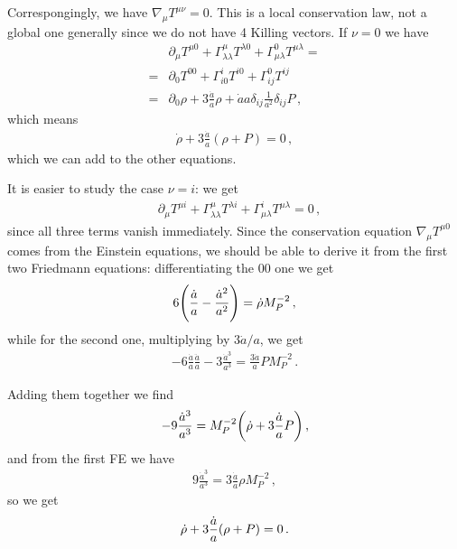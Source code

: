 \documentclass[main.tex]{subfiles}
\begin{document}
Correspongingly, we have \(\nabla_{\mu } T^{\mu \nu } =0 \). 
This is a local conservation law, not a global one generally since we do not have 4 Killing vectors. 
If \(\nu =0\) we have 
%
\begin{subequations}
\begin{align}
  &\partial_{\mu } T^{\mu 0} + \Gamma^{\mu }_{\lambda \lambda  } T^{\lambda 0} + \Gamma^{0}_{\mu \lambda } T^{\mu \lambda } = \\
  =& \partial_{0} T^{00} +
  \Gamma^{i}_{i0} T^{i0} + \Gamma^{0}_{ij} T^{ij} \\
  =& \partial_{0} \rho 
+ 3 \frac{\dot{a}}{a} \rho + \dot{a} a \delta_{ij} \frac{1}{a^2} \delta_{ij} P 
\,,
\end{align}
\end{subequations}
%
which means 
%
\begin{align}
  \dot{\rho} + 3 \frac{\dot{a}}{a} ( \rho +P) = 0
\,,
\end{align}
%
which we can add to the other equations. 

It is easier to study the case \(\nu = i\): we get 
%
\begin{align}
    &\partial_{\mu } T^{\mu i} + \Gamma^{\mu }_{\lambda \lambda  } T^{\lambda i} + \Gamma^{i}_{\mu \lambda } T^{\mu \lambda } = 0
\,,
\end{align}
%
since all three terms vanish immediately. Since the conservation  equation \(\nabla_{\mu } T^{\mu 0}\) comes from the Einstein equations, we should be able to derive it from the first two Friedmann equations: differentiating the 00 one we get 
%
\begin{align}
  6 \qty(\frac{\dot{a}}{a} - \frac{\dot{a}^2}{a^2}) = \dot{\rho} M_P^{-2} 
\,,
\end{align}
%
while for the second one, multiplying by \(3 \dot{a} / a\), we get 
%
\begin{align}
  - 6 \frac{\dot{a}}{a} \frac{\ddot{a}}{a}
  - 3 \frac{\dot{a}^3}{a^3} = \frac{3 \dot{a}}{a } P M_P^{-2}
\,.
\end{align}

Adding them together we find 
%
\begin{align}
  - 9 \frac{\dot{a}^3}{a^3} = M_P^{-2} \qty( \dot{\rho} + 3 \frac{\dot{a}}{a }P )
\,,
\end{align}
%
and from the first FE we have 
%
\begin{align}
  9 \frac{\dot{a}^3}{a^3} = 3 \frac{\dot{a}}{a} \rho M_P^{-2}
\,,
\end{align}
%
so we get 
%
\begin{align}
  \dot{\rho}
 + 3 \frac{\dot{a}}{a} \qty(\rho +P) = 0  
\,.
\end{align}
\end{document}

